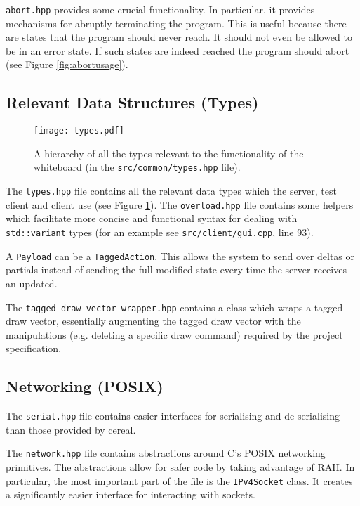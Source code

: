 \documentclass[article]{uom-coursework}
\begin{document}
\texttt{abort.hpp} provides some crucial functionality. In
particular, it provides mechanisms for abruptly terminating the
program. This is useful because there are states that the
program should never reach. It should not even be allowed to be
in an error state. If such states are indeed reached the program
should abort (see Figure \ref{fig:abortusage}).

\subsection{Relevant Data Structures (Types)}

\begin{figure}[H]
\centering
\begin{mdframed}[backgroundcolor=OffWhite]
\texttt{[image: types.pdf]}
\end{mdframed}
\caption{A hierarchy of all the types relevant to the
functionality of the whiteboard (in the
\texttt{src/common/types.hpp} file).}
\label{fig:typetree}
\end{figure}

The \texttt{types.hpp} file contains all the relevant data types
which the server, test client and client use (see Figure
\ref{fig:typetree}). The \texttt{overload.hpp} file contains
some helpers which facilitate more concise and functional syntax
for dealing with \texttt{std::variant} types (for an example see
\texttt{src/client/gui.cpp}, line 93).

\begin{note}
    A \texttt{Payload} can be a \texttt{TaggedAction}. This
    allows the system to send over deltas or partials instead of
    sending the full modified state every time the server
    receives an updated.
\end{note}

The \texttt{tagged\_draw\_vector\_wrapper.hpp} contains a class
which wraps a tagged draw vector, essentially augmenting the
tagged draw vector with the manipulations (e.g. deleting a
specific draw command) required by the project specification.

\subsection{Networking (POSIX)}

The \texttt{serial.hpp} file contains easier interfaces for
serialising and de-serialising than those provided by cereal.

The \texttt{network.hpp} file contains abstractions around C's
POSIX networking primitives. The abstractions allow for safer
code by taking advantage of RAII. In particular, the most
important part of the file is the \texttt{IPv4Socket} class. It
creates a significantly easier interface for interacting with
sockets.
\end{document}
